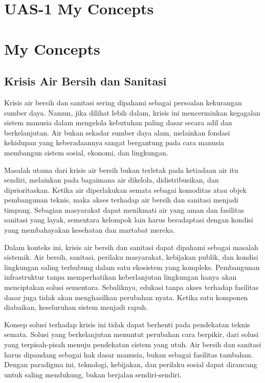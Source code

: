 \documentclass[
  letterpaper,
  DIV=11,
  numbers=noendperiod]{scrreprt}
\begin{document}

\chapter{UAS-1 My Concepts}\label{uas-1-my-concepts}


\chapter{My Concepts}\label{my-concepts}

\section{Krisis Air Bersih dan
Sanitasi}\label{krisis-air-bersih-dan-sanitasi}

Krisis air bersih dan sanitasi sering dipahami sebagai persoalan
kekurangan sumber daya. Namun, jika dilihat lebih dalam, krisis ini
mencerminkan kegagalan sistem manusia dalam mengelola kebutuhan paling
dasar secara adil dan berkelanjutan. Air bukan sekadar sumber daya alam,
melainkan fondasi kehidupan yang keberadaannya sangat bergantung pada
cara manusia membangun sistem sosial, ekonomi, dan lingkungan.

Masalah utama dari krisis air bersih bukan terletak pada ketiadaan air
itu sendiri, melainkan pada bagaimana air dikelola, didistribusikan, dan
diprioritaskan. Ketika air diperlakukan semata sebagai komoditas atau
objek pembangunan teknis, maka akses terhadap air bersih dan sanitasi
menjadi timpang. Sebagian masyarakat dapat menikmati air yang aman dan
fasilitas sanitasi yang layak, sementara kelompok lain harus beradaptasi
dengan kondisi yang membahayakan kesehatan dan martabat mereka.

Dalam konteks ini, krisis air bersih dan sanitasi dapat dipahami sebagai
masalah sistemik. Air bersih, sanitasi, perilaku masyarakat, kebijakan
publik, dan kondisi lingkungan saling terhubung dalam satu ekosistem
yang kompleks. Pembangunan infrastruktur tanpa memperhatikan
keberlanjutan lingkungan hanya akan menciptakan solusi sementara.
Sebaliknya, edukasi tanpa akses terhadap fasilitas dasar juga tidak akan
menghasilkan perubahan nyata. Ketika satu komponen diabaikan,
keseluruhan sistem menjadi rapuh.

Konsep solusi terhadap krisis ini tidak dapat berhenti pada pendekatan
teknis semata. Solusi yang berkelanjutan menuntut perubahan cara
berpikir, dari solusi yang terpisah-pisah menuju pendekatan sistem yang
utuh. Air bersih dan sanitasi harus dipandang sebagai hak dasar manusia,
bukan sebagai fasilitas tambahan. Dengan paradigma ini, teknologi,
kebijakan, dan perilaku sosial dapat dirancang untuk saling mendukung,
bukan berjalan sendiri-sendiri.
\end{document}

